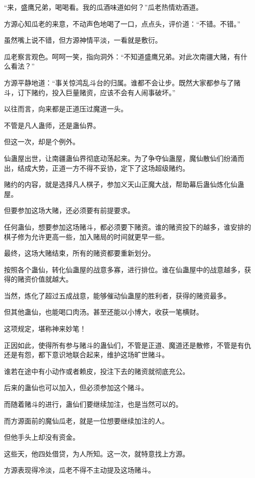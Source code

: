 \begin{this_body}
“来，盛鹰兄弟，喝喝看。我的瓜酒味道如何？”瓜老热情劝酒道。

方源心知瓜老的来意，不动声色地喝了一口，点点头，评价道：“不错。不错。”

虽然嘴上说不错，但方源神情平淡，一看就是敷衍。

瓜老察言观色。呵呵一笑，指向洞外：“不知道盛鹰兄弟。对此次南疆大赌，有什么看法？”

方源平静地道：“事关惊鸿乱斗台的归属。谁都不会让步。既然大家都参与了赌斗，订下赌约，投入巨量赌资，应该不会有人闹事破坏。”

以往而言，向来都是正道压过魔道一头。

不管是凡人蛊师，还是蛊仙界。

但这一次，却是个例外。

仙蛊屋出世，让南疆蛊仙界彻底动荡起来。为了争夺仙蛊屋，魔仙散仙们纷涌而出，结成大势，正道一方不得不妥协，定下了这场超级赌约。

赌约的内容，就是选择凡人棋子，参加义天山正魔大战，帮助幕后蛊仙炼化仙蛊屋。

但要参加这场大赌，还必须要有前提要求。

任何蛊仙，想要参加这场赌斗，都必须要下赌资。谁的赌资投下的越多，谁安排的棋子修为允许更高一些，加入赌局的时间就更早一些。

最终，这场大赌结束，所有的赌资都要重新划分。

按照各个蛊仙，转化仙蛊屋的战意多寡，进行排位。谁在仙蛊屋中的战意越多，获得的赌资价值就越大。

当然，炼化了超过五成战意，能够催动仙蛊屋的胜利者，获得的赌资最多。

但其他蛊仙，也能喝口肉汤。甚至还能以小博大，收获一笔横财。

这项规定，堪称神来妙笔！

正因如此，使得所有参与赌斗的蛊仙们，不管是正道、魔道还是散修，不管是有仇还是有怨，都下意识地联合起来，维护这场旷世赌斗。

谁若在途中有小动作或者赖皮，投注下去的赌资就彻底充公。

后来的蛊仙也可以加入，但必须参加这个赌斗。

而随着赌斗的进行，蛊仙们要继续加注，也是当然可以的。

而方源面前的魔仙瓜老，就是一位想要继续加注的人。

但他手头上却没有资金。

这些天，他四处借贷，为人所知。这一次，就特意找上方源。

方源表现得冷淡，瓜老不得不主动提及这场赌斗。


\end{this_body}
